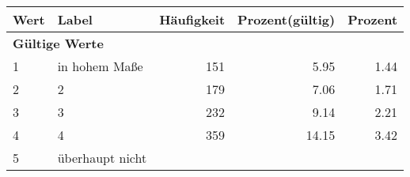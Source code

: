      \begin{longtable}{lXrrr}
     \toprule
     \textbf{Wert} & \textbf{Label} & \textbf{Häufigkeit} & \textbf{Prozent(gültig)} & \textbf{Prozent} \\
     \endhead
     \midrule
     \multicolumn{5}{l}{\textbf{Gültige Werte}}\\

     1 &
     \multicolumn{1}{X}{ in hohem Maße   } &


       \num{151} &
       \num[round-mode=places,round-precision=2]{5.95} &
         \num[round-mode=places,round-precision=2]{1.44} \\

     2 &
     \multicolumn{1}{X}{ 2   } &


       \num{179} &
       \num[round-mode=places,round-precision=2]{7.06} &
         \num[round-mode=places,round-precision=2]{1.71} \\

     3 &
     \multicolumn{1}{X}{ 3   } &


       \num{232} &
       \num[round-mode=places,round-precision=2]{9.14} &
         \num[round-mode=places,round-precision=2]{2.21} \\

     4 &
     \multicolumn{1}{X}{ 4   } &


       \num{359} &
       \num[round-mode=places,round-precision=2]{14.15} &
         \num[round-mode=places,round-precision=2]{3.42} \\

     5 &
     \multicolumn{1}{X}{ überhaupt nicht   } &



\end{longtable}
